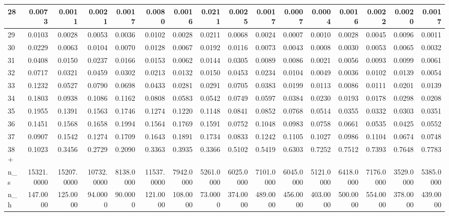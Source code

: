 \documentclass[
  11pt,
]{article}
\begin{document}
\begin{tabular}{l|r|r|r|r|r|r|r|r|r|r|r|r|r|r|r}
\hline
28 & 0.0073 & 0.0011 & 0.0021 & 0.0017 & 0.0080 & 0.0016 & 0.0211 & 0.0025 & 0.0017 & 0.0007 & 0.0004 & 0.0016 & 0.0022 & 0.0020 & 0.0017\\
\hline
29 & 0.0103 & 0.0028 & 0.0053 & 0.0036 & 0.0102 & 0.0028 & 0.0211 & 0.0068 & 0.0024 & 0.0007 & 0.0010 & 0.0028 & 0.0045 & 0.0096 & 0.0011\\
\hline
30 & 0.0229 & 0.0063 & 0.0104 & 0.0070 & 0.0128 & 0.0067 & 0.0192 & 0.0116 & 0.0073 & 0.0043 & 0.0008 & 0.0030 & 0.0053 & 0.0065 & 0.0032\\
\hline
31 & 0.0408 & 0.0150 & 0.0237 & 0.0166 & 0.0153 & 0.0062 & 0.0144 & 0.0305 & 0.0089 & 0.0086 & 0.0021 & 0.0056 & 0.0093 & 0.0099 & 0.0061\\
\hline
32 & 0.0717 & 0.0321 & 0.0459 & 0.0302 & 0.0213 & 0.0132 & 0.0150 & 0.0453 & 0.0234 & 0.0104 & 0.0049 & 0.0036 & 0.0102 & 0.0139 & 0.0054\\
\hline
33 & 0.1232 & 0.0527 & 0.0790 & 0.0698 & 0.0433 & 0.0281 & 0.0291 & 0.0705 & 0.0383 & 0.0199 & 0.0113 & 0.0086 & 0.0111 & 0.0201 & 0.0139\\
\hline
34 & 0.1803 & 0.0938 & 0.1086 & 0.1162 & 0.0808 & 0.0583 & 0.0542 & 0.0749 & 0.0597 & 0.0384 & 0.0230 & 0.0193 & 0.0178 & 0.0298 & 0.0208\\
\hline
35 & 0.1955 & 0.1391 & 0.1563 & 0.1746 & 0.1274 & 0.1220 & 0.1148 & 0.0841 & 0.0852 & 0.0768 & 0.0514 & 0.0355 & 0.0332 & 0.0303 & 0.0351\\
\hline
36 & 0.1451 & 0.1568 & 0.1658 & 0.1994 & 0.1564 & 0.1769 & 0.1591 & 0.0752 & 0.1048 & 0.0983 & 0.0758 & 0.0661 & 0.0535 & 0.0425 & 0.0552\\
\hline
37 & 0.0907 & 0.1542 & 0.1274 & 0.1709 & 0.1643 & 0.1891 & 0.1734 & 0.0833 & 0.1242 & 0.1105 & 0.1027 & 0.0986 & 0.1104 & 0.0674 & 0.0748\\
\hline
38+ & 0.1023 & 0.3456 & 0.2729 & 0.2090 & 0.3363 & 0.3935 & 0.3366 & 0.5102 & 0.5419 & 0.6303 & 0.7252 & 0.7512 & 0.7393 & 0.7648 & 0.7783\\
\hline
n\_s & 15321.0000 & 15207.0000 & 10732.0000 & 8138.0000 & 11537.0000 & 7942.0000 & 5261.0000 & 6025.0000 & 7101.0000 & 6045.0000 & 5121.0000 & 6418.0000 & 7176.0000 & 3529.0000 & 5385.0000\\
\hline
n\_h & 147.0000 & 125.0000 & 94.0000 & 90.0000 & 121.0000 & 108.0000 & 73.0000 & 374.0000 & 489.0000 & 456.0000 & 403.0000 & 500.0000 & 554.0000 & 378.0000 & 439.0000\\
\hline
\end{tabular}
\end{document}
